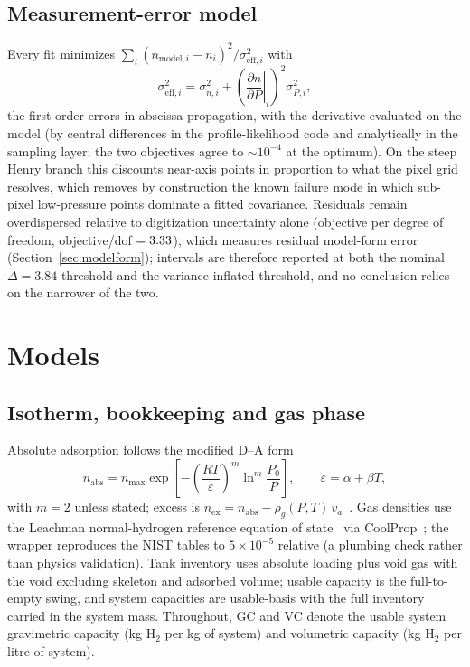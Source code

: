 \documentclass[preprint,12pt]{elsarticle}
\begin{document}
\subsection{Measurement-error model}

Every fit minimizes
$\sum_i (n_{\mathrm{model},i}-n_i)^2/\sigma_{\mathrm{eff},i}^2$ with
\begin{equation}
\sigma_{\mathrm{eff},i}^2=\sigma_{n,i}^2
  +\left(\left.\frac{\partial n}{\partial P}\right|_i\right)^2
   \sigma_{P,i}^2,
\end{equation}
the first-order errors-in-abscissa propagation, with
the derivative evaluated on the model (by central differences in the
profile-likelihood code and analytically in the sampling layer; the two
objectives agree to $\sim10^{-4}$ at the optimum). On the steep Henry
branch this discounts near-axis points in proportion to what the pixel grid
resolves, which removes by construction the known failure mode in which
sub-pixel low-pressure points dominate a fitted covariance. Residuals remain
overdispersed relative to digitization uncertainty alone
(objective per degree of freedom, objective/dof $=3.33$), which
measures residual model-form error
(Section~\ref{sec:modelform}); intervals are therefore reported at both the
nominal $\Delta=3.84$ threshold and the variance-inflated threshold, and no
conclusion relies on the narrower of the two.

\section{Models}

\subsection{Isotherm, bookkeeping and gas phase}

Absolute adsorption follows the modified D--A form
\begin{equation}
n_{\mathrm{abs}}
  = n_{\max}\exp\!\left[-\left(\frac{RT}{\varepsilon}\right)^{m}
    \ln^{m}\!\frac{P_0}{P}\right],
\qquad \varepsilon=\alpha+\beta T,
\end{equation}
with $m=2$ unless stated; excess is
$n_{\mathrm{ex}}=n_{\mathrm{abs}}-\rho_g(P,T)\,v_a$~\cite{richard2009a}.
Gas densities use the Leachman normal-hydrogen reference equation of
state~\cite{leachman2009} via CoolProp~\cite{bell2014}; the wrapper
reproduces the NIST tables to $5\times10^{-5}$ relative (a plumbing check
rather than physics validation). Tank inventory uses absolute loading plus void gas
with the void excluding skeleton and adsorbed volume; usable capacity is the
full-to-empty swing, and system capacities are usable-basis with the full
inventory carried in the system mass. Throughout, GC and VC denote the
usable system gravimetric capacity (kg H$_2$ per kg of system) and
volumetric capacity (kg H$_2$ per litre of system).
\end{document}
